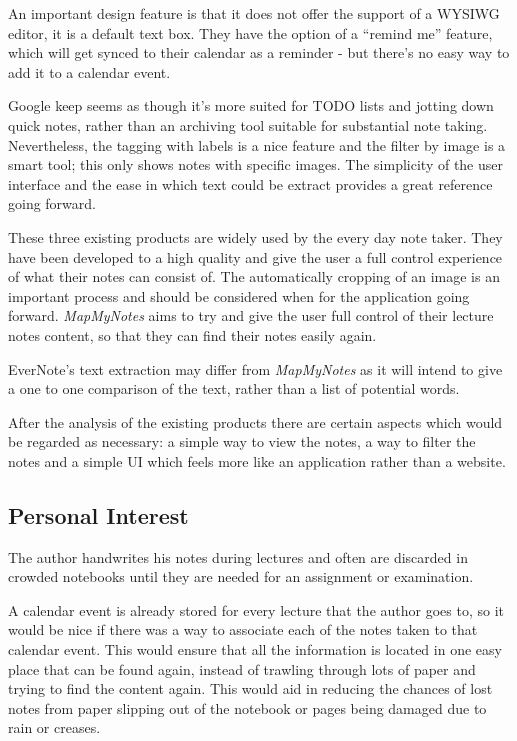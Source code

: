 An important design feature is that it does not offer the support of a WYSIWG editor, it is a default text box. They have the option of a ``remind me'' feature, which will get synced to their calendar as a reminder - but there's no easy way to add it to a calendar event.

Google keep seems as though it's more suited for TODO lists and jotting down quick notes, rather than an archiving tool suitable for substantial note taking. Nevertheless, the tagging with labels is a nice feature and the filter by image is a smart tool; this only shows notes with specific images. The simplicity of the user interface and the ease in which text could be extract provides a great reference going forward.

\begin{flushleft}
These three existing products are widely used by the every day note taker. They have been developed to a high quality and give the user a full control experience of what their notes can consist of. The automatically cropping of an image is an important process and should be considered when for the application going forward. \textit{MapMyNotes} aims to try and give the user full control of their lecture notes content, so that they can find their notes easily again.

EverNote's text extraction may differ from \textit{MapMyNotes} as it will intend to give a one to one comparison of the text, rather than a list of potential words.

After the analysis of the existing products there are certain aspects which would be regarded as necessary: a simple way to view the notes, a way to filter the notes and a simple UI which feels more like an application rather than a website.
\end{flushleft}


\subsection{Personal Interest}
The author handwrites his notes during lectures and often are discarded in crowded notebooks until they are needed for an assignment or examination.

A calendar event is already stored for every lecture that the author goes to, so it would be nice if there was a way to associate each of the notes taken to that calendar event. This would ensure that all the information is located in one easy place that can be found again, instead of trawling through lots of paper and trying to find the content again. This would aid in reducing the chances of lost notes from paper slipping out of the notebook or pages being damaged due to rain or creases.

